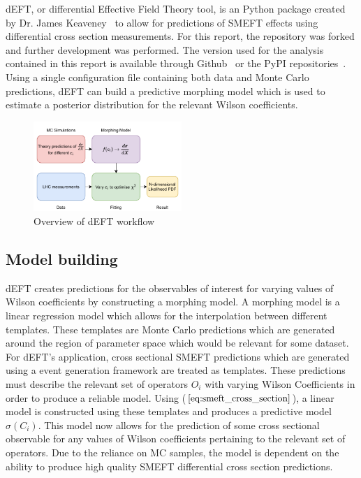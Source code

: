 \documentclass[a4paper,11pt]{article}
\begin{document}
dEFT, or differential Effective Field Theory tool, is an Python package created by Dr. James Keaveney~\cite{Keaveney_dEFT} to allow for predictions of SMEFT effects using differential cross section measurements.
For this report, the repository was forked and further development was performed.
The version used for the analysis contained in this report is available through Github~\cite{codecalec_dEFT} or the PyPI repositories~\cite{pypi_dEFT}.
Using a single configuration file containing both data and Monte Carlo predictions, dEFT can build a predictive morphing model which is used to estimate a posterior distribution for the relevant Wilson coefficients.

\begin{figure}[htb]
    \centering
    \includegraphics[width=0.5\textwidth]{images/deft-workflow.pdf}
    \caption{Overview of dEFT workflow}
\end{figure}

\subsection{Model building}
dEFT creates predictions for the observables of interest for varying values of Wilson coefficients by constructing a morphing model.
A morphing model is a linear regression model which allows for the interpolation between different templates.
These templates are Monte Carlo predictions which are generated around the region of parameter space which would be relevant for some dataset.
For dEFT's application, cross sectional SMEFT predictions which are generated using a event generation framework are treated as templates.
These predictions must describe the relevant set of operators $O_{i}$ with varying Wilson Coefficients in order to produce a reliable model.
Using ($\ref{eq:smeft_cross_section}$), a linear model is constructed using these templates and produces a predictive model $\hat{\sigma}({C_i})$.
This model now allows for the prediction of some cross sectional observable for any values of Wilson coefficients pertaining to the relevant set of operators.
Due to the reliance on MC samples, the model is dependent on the ability to produce high quality SMEFT differential cross section predictions.
\end{document}
